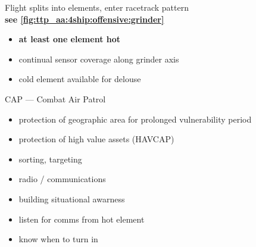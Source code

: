 
\clearpage

\begin{tcoloritemize}
    \blueitem[Grinder]
    Flight splits into elements, enter racetrack pattern\\
    \hfill\textbf{see \cref{fig:ttp_aa:4ship:offensive:grinder}}
    \begin{itemize}
        \item \textbf{at least one element hot}
        \item continual sensor coverage along grinder axis
        \item cold element available for delouse
    \end{itemize}

     CAP --- Combat Air Patrol 
    \begin{itemize}
        \item protection of geographic area for prolonged vulnerability period
        \item protection of high value assets (HAVCAP)
    \end{itemize}

    \begin{itemize}
        \item sorting, targeting
        \item radio / communications
    \end{itemize}

    \begin{itemize}
        \item building situational awarness
        \item listen for comms from hot element
        \item know when to turn in
    \end{itemize}
\end{tcoloritemize}


